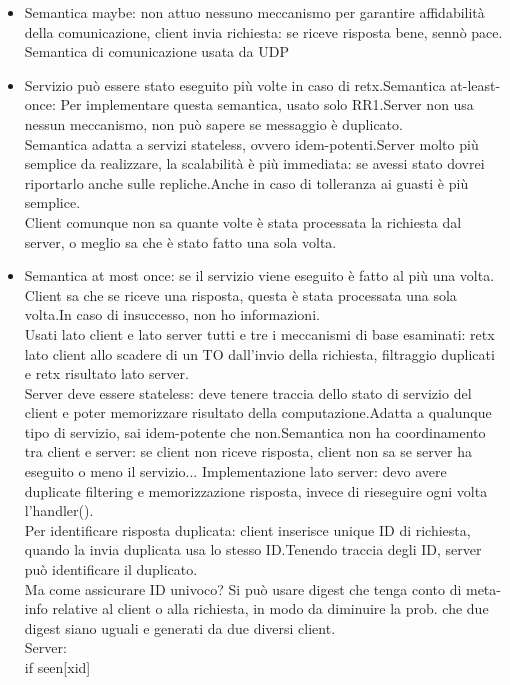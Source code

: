 \documentclass[16px]{article}
\begin{document}
\begin{itemize}
\item Semantica maybe: non attuo nessuno meccanismo per garantire affidabilità della comunicazione, client invia richiesta: se riceve risposta bene, sennò pace. Semantica di comunicazione usata da UDP
\item Servizio può essere stato eseguito più volte in caso di retx.Semantica at-least-once: Per implementare questa semantica, usato solo RR1.Server non usa nessun meccanismo, non può sapere se messaggio è duplicato.\\Semantica adatta a servizi stateless, ovvero idem-potenti.Server molto più semplice da realizzare, la scalabilità è più immediata: se avessi stato dovrei riportarlo anche sulle repliche.Anche in caso di tolleranza ai guasti è più semplice.\\Client comunque non sa quante volte è stata processata la richiesta dal server, o meglio sa che è stato fatto una sola volta.
\item Semantica at most once: se il servizio viene eseguito è fatto al più una volta. Client sa che se riceve una risposta, questa è stata processata una sola volta.In caso di insuccesso, non ho informazioni.\\Usati lato client e lato server tutti e tre i meccanismi di base esaminati: retx lato client allo scadere di un TO dall'invio della richiesta, filtraggio duplicati e retx risultato lato server.\\Server deve essere stateless: deve tenere traccia dello stato di servizio del client e poter memorizzare risultato della computazione.Adatta a qualunque tipo di servizio, sai idem-potente che non.Semantica non ha coordinamento tra client e server: se client non riceve risposta, client non sa se server ha eseguito o meno il servizio...
Implementazione lato server: devo avere duplicate filtering e memorizzazione risposta, invece di rieseguire ogni volta l'handler().\\Per identificare risposta duplicata: client inserisce unique ID di richiesta, quando la invia duplicata usa lo stesso ID.Tenendo traccia degli ID, server può identificare il duplicato.\\Ma come assicurare ID univoco? Si può usare digest che tenga conto di meta-info relative al client o alla richiesta, in modo da diminuire la prob. che due digest siano uguali e generati da due diversi client.\\Server:\\
if seen[xid]\\

\end{itemize}
\end{document}
